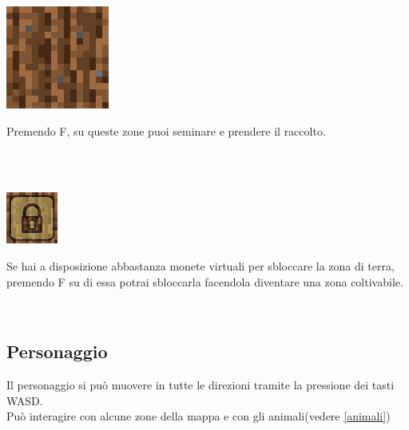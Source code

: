 \documentclass[a4paper,12pt]{report}
\begin{document}
		
	
		\begin{minipage}{.30\textwidth}
			\centering
			\includegraphics[width=.50\textwidth]{img/farmland.png}
		\end{minipage}%
		\begin{minipage}{.70\textwidth}
			{Premendo F, su queste zone puoi seminare e prendere il raccolto.}
		\end{minipage}\\
	\\
	
	
		\begin{minipage}{.30\textwidth}
			\centering
			\includegraphics[width=.50\textwidth]{img/lock3.png}
		\end{minipage}%
		\begin{minipage}{.70\textwidth}
			{Se hai a disposizione abbastanza monete virtuali per sbloccare la zona di terra, premendo F su di essa potrai sbloccarla facendola diventare una zona coltivabile.}
		\end{minipage}\\

\subsection{Personaggio}
	\label{personaggio}
	Il personaggio si può muovere in tutte le direzioni tramite la pressione dei tasti WASD.\\
	Può interagire con alcune zone della mappa e con gli animali(vedere \cref{animali})
\end{document}
